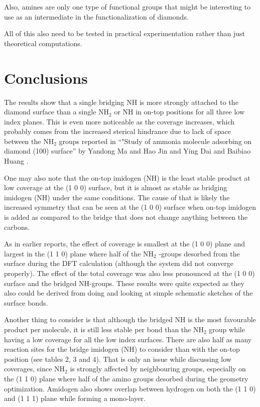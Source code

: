\documentclass[10pt,a4paper]{article}
\begin{document}
Also, amines are only one type of functional groups that might be interesting to use as an intermediate in the functionalization of diamonds. 


All of this also need to be tested in practical experimentation rather than just theoretical computations.


\section{Conclusions}
The results show that a single bridging NH is more strongly attached to the diamond surface than a single NH$_2$ or NH in on-top positions for all three low index planes. This is even more noticeable as the coverage increases, which probably comes from the increased sterical hindrance due to lack of space between the NH$_2$ groups reported in ``"Study of ammonia molecule adsorbing on diamond (100) surface'' by Yandong Ma and Hao Jin and Ying Dai and Baibiao Huang \cite{yan.dong2010}.

 One may also note that the on-top imidogen (NH) is the least stable product at low coverage at the (1 0 0) surface, but it is almost as stable as bridging imidogen (NH) under the same conditions. The cause of that is likely the increased symmetry that can be seen at the (1 0 0) surface when on-top imidogen is added as compared to the bridge that does not change anything between the carbons. 

 As in earlier reports, the effect of coverage is smallest at the (1 0 0) plane and largest in the (1 1 0) plane where half of the NH$_2$ -groups desorbed from the surface during the DFT calculation (although the system did not converge properly). The effect of the total coverage was also less pronounced at the (1 0 0) surface and the bridged NH-groups. These results were quite expected as they also could be derived from doing and looking at  simple schematic sketches of the surface bonds.
 
 
 Another thing to consider is that although the bridged NH is the most favourable product per molecule, it is still less stable per bond than the NH$_2$ group while having a low coverage for all the low index surfaces. There are also half as many reaction sites for the bridge imidogen (NH) to consider than with the on-top position (see tables 2, 3 and 4). That is only an issue while discussing low coverages, since NH$_2$ is strongly affected by neighbouring groups, especially on the (1 1 0) plane where half of the amino groups desorbed during the geometry optimization. Amidogen also shows overlap between hydrogen on both the (1 1 0) and (1 1 1) plane while forming a mono-layer. 
 
\end{document}
